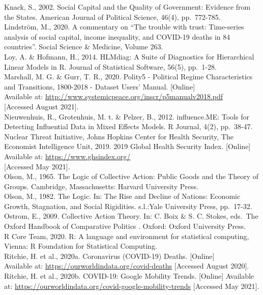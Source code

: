 \documentclass[
  12pt,
]{article}
\begin{document}
Knack, S., 2002. Social Capital and the Quality of Government: Evidence from the States. American Journal of Political Science, 46(4), pp.~772-785.\\
Lindström, M., 2020. A commentary on ``The trouble with trust: Time-series analysis of social capital, income inequality, and COVID-19 deaths in 84 countries''. Social Science \& Medicine, Volume 263.\\
Loy, A. \& Hofmann, H., 2014. HLMdiag: A Suite of Diagnostics for Hierarchical Linear Models in R. Journal of Statistical Software, 56(5), pp.~1-28.\\
Marshall, M. G. \& Gurr, T. R., 2020. Polity5 - Political Regime Characteristics and Transitions, 1800-2018 - Dataset Users' Manual. {[}Online{]}\\
Available at: \url{http://www.systemicpeace.org/inscr/p5manualv2018.pdf}\\
{[}Accessed August 2021{]}.\\
Nieuwenhuis, R., Grotenhuis, M. t. \& Pelzer, B., 2012. influence.ME: Tools for Detecting Influential Data in Mixed Effects Models. R Journal, 4(2), pp.~38-47.\\
Nuclear Threat Initiative, Johns Hopkins Center for Health Security, The Economist Intelligence Unit, 2019. 2019 Global Health Security Index. {[}Online{]}\\
Available at: \url{https://www.ghsindex.org/}\\
{[}Accessed May 2021{]}.\\
Olson, M., 1965. The Logic of Collective Action: Public Goods and the Theory of Groups. Cambridge, Massachusetts: Harvard University Press.\\
Olson, M., 1982. The Logic. In: The Rise and Decline of Nations: Economic Growth, Stagnation, and Social Rigidities. s.l.:Yale University Press, pp.~17-32.\\
Ostrom, E., 2009. Collective Action Theory. In: C. Boix \& S. C. Stokes, eds.~The Oxford Handbook of Comparative Politics . Oxford: Oxford University Press.\\
R Core Team, 2020. R: A language and environment for statistical computing, Vienna: R Foundation for Statistical Computing.\\
Ritchie, H. et al., 2020a. Coronavirus (COVID-19) Deaths. {[}Online{]}\\
Available at: \url{https://ourworldindata.org/covid-deaths} {[}Accessed August 2020{]}.\\
Ritchie, H. et al., 2020b. COVID-19: Google Mobility Trends. {[}Online{]} Available at: \url{https://ourworldindata.org/covid-google-mobility-trends} {[}Accessed May 2021{]}.\\
\end{document}
